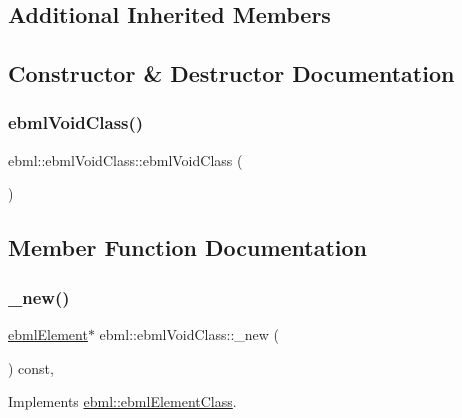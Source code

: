 \subsection*{Additional Inherited Members}


\subsection{Constructor \& Destructor Documentation}
\mbox{\label{classebml_1_1ebmlVoidClass_afc8666d6bbcd41bad76bfc5a2b5b4c9a}} 
\subsubsection{\texorpdfstring{ebml\+Void\+Class()}{ebmlVoidClass()}}
{\footnotesize\ttfamily ebml\+::ebml\+Void\+Class\+::ebml\+Void\+Class (\begin{DoxyParamCaption}{ }\end{DoxyParamCaption})}



\subsection{Member Function Documentation}
\mbox{\label{classebml_1_1ebmlVoidClass_a8852efa478e785ae70b4fce60f67e6f7}} 
\subsubsection{\texorpdfstring{\+\_\+new()}{\_new()}}
{\footnotesize\ttfamily \mbox{\hyperlink{classebml_1_1ebmlElement}{ebml\+Element}}$\ast$ ebml\+::ebml\+Void\+Class\+::\+\_\+new (\begin{DoxyParamCaption}{ }\end{DoxyParamCaption}) const\hspace{0.3cm}{\ttfamily [protected]}, {\ttfamily [virtual]}}



Implements \mbox{\hyperlink{classebml_1_1ebmlElementClass_a223ede6b8bc3c85251d2d73f0256fb45}{ebml\+::ebml\+Element\+Class}}.

